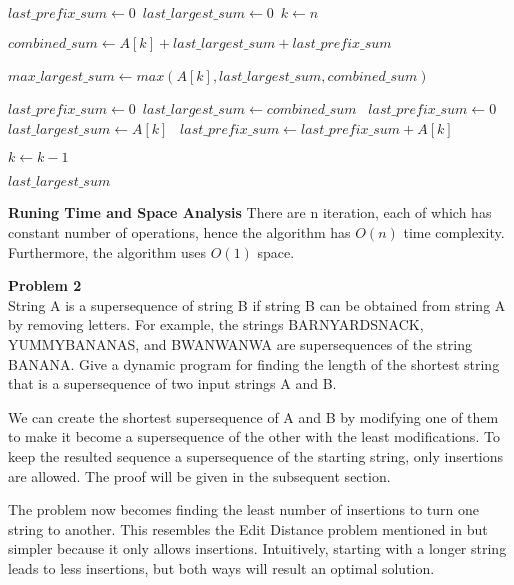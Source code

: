 \documentclass[12pt,article]{article}
\newenvironment{problem}[2][Problem]
    { \begin{mdframed}[backgroundcolor=gray!20] \textbf{#1 #2} \\}
    {  \end{mdframed}}
\begin{document}
\begin{algorithm}
\caption{$LSA(A[1:n])$}\label{alg:LSA}
\begin{algorithmic}
    \State $last\_prefix\_sum \gets 0$\
    \State $last\_largest\_sum \gets 0$\
    \State $k \gets n$\;
    
        \State $combined\_sum \gets A[k] + last\_largest\_sum + last\_prefix\_sum$

        \State $max\_largest\_sum \gets max(A[k], last\_largest\_sum, combined\_sum)$\

        \If{$combined\_sum == max\_largest\_sum$}
            \State $last\_prefix\_sum \gets 0$\
            \State $last\_largest\_sum \gets combined\_sum$\
            \State $last\_prefix\_sum \gets 0$\
            \State $last\_largest\_sum \gets A[k]$\
            \State $last\_prefix\_sum \gets last\_prefix\_sum + A[k]$\
        \EndIf

        \State $k \gets k - 1$
    \EndWhile

    \Return $last\_largest\_sum$
\end{algorithmic}
\end{algorithm}

\textbf{Runing Time and Space Analysis}
There are n iteration, each of which has constant number of operations, hence the algorithm has $O(n)$ time complexity. Furthermore, the algorithm uses $O(1)$ space.
\newpage
\begin{problem}{2} 
String A is a supersequence of string B if string B can be obtained from string A by removing letters. For example, the strings BARNYARDSNACK, YUMMYBANANAS, and BWANWANWA are supersequences of the string BANANA. Give a dynamic program for finding the length of the shortest string that is a supersequence of two input strings A and B.
\end{problem}

We can create the shortest supersequence of A and B by modifying one of them to make it become a supersequence of the other with the least modifications. To keep the resulted sequence a supersequence of the starting string, only insertions are allowed. The proof will be given in the subsequent section. 

The problem now becomes finding the least number of insertions to turn one string to another. This resembles the Edit Distance problem mentioned in \cite{JeffE19} but simpler because it only allows insertions. Intuitively, starting with a longer string leads to less insertions, but both ways will result an optimal solution.
\end{document}
